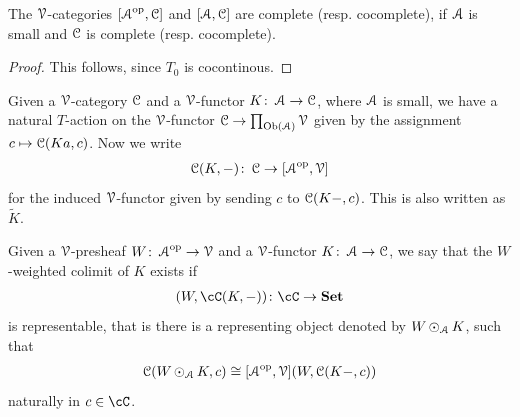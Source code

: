 \documentclass[a4paper,11pt,oneside,openany]{scrbook}
\begin{document}
\begin{prop}
	The $\V$-categories $[\A^{\op},\C]$ and $[\A,\C]$ are complete (resp. cocomplete), if $\A$ is small and $\C$ is complete (resp. cocomplete).
\end{prop}

\begin{proof}
	This follows, since $T_{0}$ is cocontinous.
\end{proof}

\begin{defn}
	Given a $\V$-category $\C$ and a $\V$-functor $K \from \A \to \C$, where $\A$ is small, we have a natural $T$-action on the $\V$-functor
	$\C \to \prod_{\Ob(\A)}\V$ given by the assignment $c \mapsto \C(Ka,c)$. Now we write
	\begin{align*}
		\C(K,-) \from \C \to [\A^{\op},\V]
	\end{align*}
	for the induced $\V$-functor given by sending $c$ to $\C(K-,c)$. This is also written as $\widetilde{K}$.
\end{defn}

\begin{defn}
	Given a $\V$-presheaf $W\from \A^{\op} \to \V$ and a $\V$-functor $K \from \A \to \C$, we say that the $W$-weighted colimit of $K$ exists if
	\begin{align*}
		[\A^{\op},\V](W,\cC(K,-))\colon\cC\rightarrow\Set
	\end{align*}
	is representable, that is there is a representing object denoted by $W \copw_{\A} K$, such that
	\begin{align*}
		\C(W\copw_{\A} K, c) \iso [\A^{\op},\V](W,\C(K-,c))
	\end{align*}
	naturally in $c\in\cC$.
\end{defn}
\end{document}
